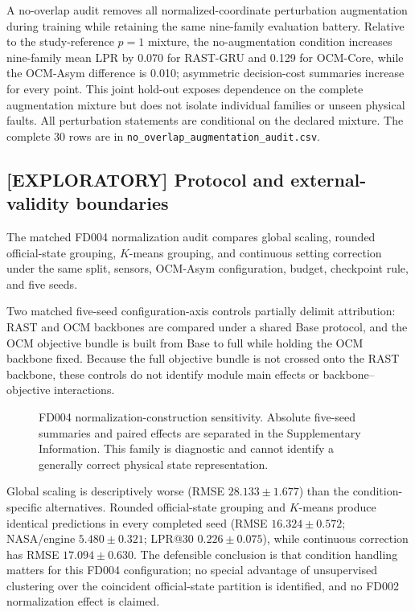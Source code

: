 A no-overlap audit removes all normalized-coordinate perturbation augmentation during training while retaining the same nine-family evaluation battery. Relative to the study-reference $p=1$ mixture, the no-augmentation condition increases nine-family mean LPR by 0.070 for RAST-GRU and 0.129 for OCM-Core, while the OCM-Asym difference is 0.010; asymmetric decision-cost summaries increase for every point. This joint hold-out exposes dependence on the complete augmentation mixture but does not isolate individual families or unseen physical faults. All perturbation statements are conditional on the declared mixture. The complete 30 rows are in \texttt{no\_overlap\_augmentation\_audit.csv}.

\subsection{[EXPLORATORY] Protocol and external-validity boundaries}

The matched FD004 normalization audit compares global scaling, rounded official-state grouping, $K$-means grouping, and continuous setting correction under the same split, sensors, OCM-Asym configuration, budget, checkpoint rule, and five seeds.

Two matched five-seed configuration-axis controls partially delimit attribution: RAST and OCM backbones are compared under a shared Base protocol, and the OCM objective bundle is built from Base to full while holding the OCM backbone fixed. Because the full objective bundle is not crossed onto the RAST backbone, these controls do not identify module main effects or backbone--objective interactions.

\begin{figure}[!t]
\centering
{}
\caption{FD004 normalization-construction sensitivity. Absolute five-seed summaries and paired effects are separated in the Supplementary Information. This family is diagnostic and cannot identify a generally correct physical state representation.}
\label{fig:condition-normalization-controls}
\end{figure}

Global scaling is descriptively worse (RMSE $28.133\pm1.677$) than the condition-specific alternatives. Rounded official-state grouping and $K$-means produce identical predictions in every completed seed (RMSE $16.324\pm0.572$; NASA/engine $5.480\pm0.321$; LPR@30 $0.226\pm0.075$), while continuous correction has RMSE $17.094\pm0.630$. The defensible conclusion is that condition handling matters for this FD004 configuration; no special advantage of unsupervised clustering over the coincident official-state partition is identified, and no FD002 normalization effect is claimed.

